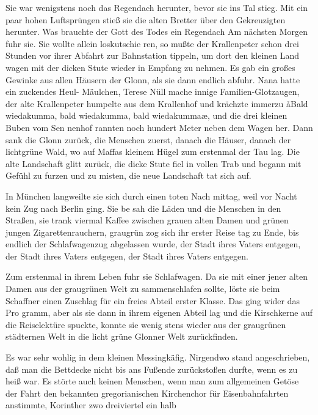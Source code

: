 Sie war wenigstens noch das Regendach herunter, bevor
sie ins Tal stieg. Mit ein paar hohen Luftsprüngen stieß sie
die alten Bretter über den Gekreuzigten herunter. Was
brauchte der Gott des Todes ein Regendach\ausr{}
\abstand{}
Am nächsten Morgen fuhr sie. Sie wollte allein loskutschie\-%
ren, so mußte der Krallenpeter schon drei Stunden vor ihrer
Abfahrt zur Bahnstation tippeln, um dort den kleinen Land\-%
wagen mit der dicken Stute wieder in Empfang zu nehmen.
Es gab ein großes Gewinke aus allen Häusern der Glonn, als
sie dann endlich abfuhr. Nana hatte ein zuckendes Heul-%
Mäulchen, Terese Nüll mache innige Familien-Glotzaugen,
der alte Krallenpeter humpelte aus dem Krallenhof und
krächzte immerzu\dopp{} \aa{}Bald wiedakumma, bald wiedakumma,
bald wiedakumma\ausr{}\ae{}, und die drei kleinen Buben vom Sen\-%
nenhof rannten noch hundert Meter neben dem Wagen her.
Dann sank die Glonn zurück, die Menschen zuerst, danach die
Häuser, danach der lichtgrüne Wald, wo auf Maffas kleinem
Hügel zum erstenmal der Tau lag. Die alte Landschaft glitt
zurück, die dicke Stute fiel in vollen Trab und begann mit
Gefühl zu furzen und zu misten, die neue Landschaft tat sich
auf.

In München langweilte sie sich durch einen toten Nach\-%
mittag, weil vor Nacht kein Zug nach Berlin ging. Sie be\-%
sah die Läden und die Menschen in den Straßen, sie trank
viermal Kaffee zwischen grauen alten Damen und grünen
jungen Zigarettenrauchern, graugrün zog sich ihr erster Reise\-%
tag zu Ende, bis endlich der Schlafwagenzug abgelassen
wurde, der Stadt ihres Vaters entgegen, der Stadt ihres
Vaters entgegen, der Stadt ihres Vaters entgegen.

Zum erstenmal in ihrem Leben fuhr sie Schlafwagen. Da sie
mit einer jener alten Damen aus der graugrünen Welt zu\-%
sammenschlafen sollte, löste sie beim Schaffner einen Zuschlag
für ein freies Abteil erster Klasse. Das ging wider das Pro\-%
gramm, aber als sie dann in ihrem eigenen Abteil lag und
die Kirschkerne auf die Reiselektüre spuckte, konnte sie wenig\-%
stens wieder aus der graugrünen städternen Welt in die licht\-%
grüne Glonner Welt zurückfinden.

Es war sehr wohlig in dem kleinen Messingkäfig. Nirgendwo
stand angeschrieben, daß man die Bettdecke nicht bis ans
Fußende zurückstoßen durfte, wenn es zu heiß war. Es störte
auch keinen Menschen, wenn man zum allgemeinen Getöse
der Fahrt den bekannten gregorianischen Kirchenchor für
Eisenbahnfahrten anstimmte, Korinther zwo dreiviertel ein\-%
halb\dopp{}

